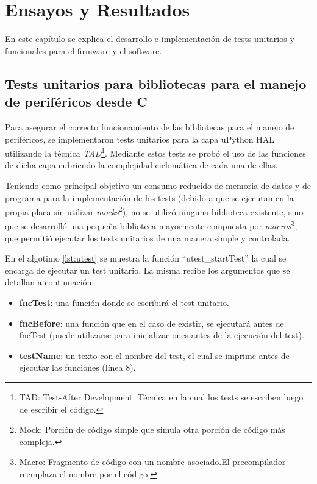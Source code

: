 
\chapter{Ensayos y Resultados} %
En este capítulo se explica el desarrollo e implementación de tests unitarios y funcionales para el firmware y el software.

\label{Chapter4} %


\section{Tests unitarios para bibliotecas para el manejo de periféricos desde C}
\label{sec:testUnitariosC}

Para asegurar el correcto funcionamiento de las bibliotecas para el manejo de periféricos, se implementaron tests unitarios para la capa uPython HAL utilizando la técnica \textit{TAD}\footnote{TAD: Test-After Development. Técnica en la cual los tests se escriben luego de escribir el código.}. Mediante estos tests se probó el uso de las funciones de dicha capa cubriendo la complejidad ciclomática de cada una de ellas.

Teniendo como principal objetivo un consumo reducido de memoria de datos y de programa para la implementación de los tests (debido a que se ejecutan en la propia placa sin utilizar \textit{mocks}\footnote{Mock: Porción de código simple que simula otra porción de código más compleja.}), no se utilizó ninguna biblioteca existente, sino que se desarrolló una pequeña biblioteca mayormente compuesta por \textit{macros}\footnote{Macro: Fragmento de código con un nombre asociado.El precompilador reemplaza el nombre por el código.}, que permitió ejecutar los tests unitarios de una manera simple y controlada.

En el algotimo \ref{lst:utest} se muestra la función “utest\_startTest” la cual se encarga de ejecutar un test unitario. La misma recibe los argumentos que se detallan a continuación:

\begin{itemize}
	\item \textbf{fncTest}: una función donde se escribirá el test unitario.
	\item \textbf{fncBefore}: una función que en el caso de existir, se ejecutará antes de fncTest (puede utilizarse para inicializaciones antes de la ejecución del test).
	\item \textbf{testName}: un texto con el nombre del test, el cual se imprime antes de ejecutar las funciones (línea 8).	
\end{itemize}
	

